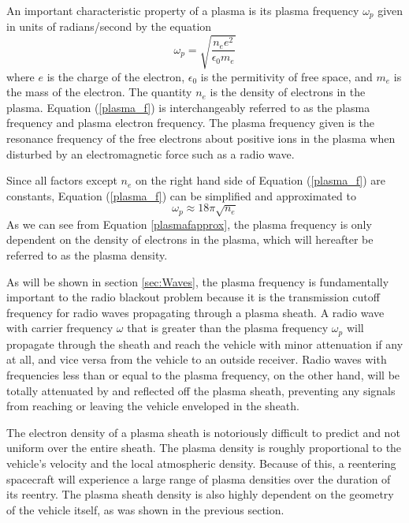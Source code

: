 \documentclass[twocolumn]{article}
\begin{document}
An important characteristic property of a plasma is its plasma frequency $\omega_p$ given in units of radians/second by the equation
\begin{equation} \label{plasma_f}
\omega_p = \sqrt{\frac{n_e e^2}{\epsilon_0 m_e}}
\end{equation}
where $e$ is the charge of the electron, $\epsilon_0$ is the permitivity of free space, and $m_e$ is the mass of the electron. 
The quantity $n_e$ is the density of electrons in the plasma.\cite{chen_introduction_1984,kim_analysis_2008}
Equation (\ref{plasma_f}) is interchangeably referred to as the plasma frequency and plasma electron frequency. The plasma frequency given is the resonance frequency of the free electrons about positive ions in the plasma when disturbed by an electromagnetic force such as a radio wave.\cite{chen_introduction_1984}

Since all factors except $n_e$ on the right hand side of  Equation (\ref{plasma_f}) are constants, Equation (\ref{plasma_f}) can be simplified and approximated to
\begin{equation} \label{plasmafapprox}
\omega_p \approx 18\pi\sqrt{n_e}
\end{equation}
As we can see from Equation \ref{plasmafapprox}, the plasma frequency is only dependent on the density of electrons in the plasma, which will hereafter be referred to as the plasma density.

As will be shown in section \ref{sec:Waves}, the plasma frequency is fundamentally important to the radio blackout problem because it is the transmission cutoff frequency for radio waves propagating through a plasma sheath.
A radio wave with carrier frequency $\omega$ that is greater than the plasma frequency $\omega_p$ will propagate through the sheath and reach the vehicle with minor attenuation if any at all, and vice versa from the vehicle to an outside receiver.
Radio waves with frequencies less than or equal to the plasma frequency, on the other hand, will be totally attenuated by and reflected off the plasma sheath, preventing any signals from reaching or leaving the vehicle enveloped in the sheath.

The electron density of a plasma sheath is notoriously difficult to predict and not uniform over the entire sheath.
The plasma density is roughly proportional to the vehicle's velocity and the local atmospheric density.
Because of this, a reentering spacecraft will experience a large range of plasma densities over the duration of its reentry.
The plasma sheath density is also highly dependent on the geometry of the vehicle itself, as was shown in the previous section.
\end{document}
